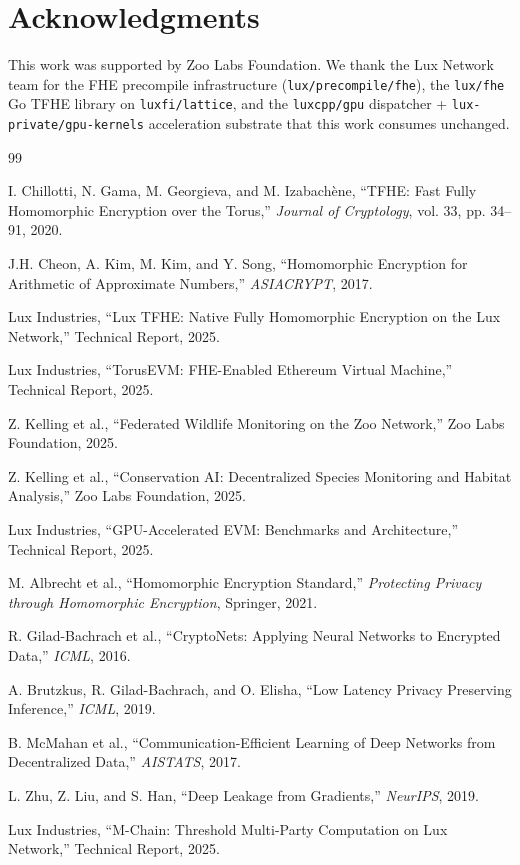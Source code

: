 \section*{Acknowledgments}


This work was supported by Zoo Labs Foundation. We thank the Lux Network team for the FHE precompile infrastructure (\texttt{lux/precompile/fhe}), the \texttt{lux/fhe} Go TFHE library on \texttt{luxfi/lattice}, and the \texttt{luxcpp/gpu} dispatcher + \texttt{lux-private/gpu-kernels} acceleration substrate that this work consumes unchanged.


\begin{thebibliography}{99}

I. Chillotti, N. Gama, M. Georgieva, and M. Izabach\`{e}ne, ``TFHE: Fast Fully Homomorphic Encryption over the Torus,'' \textit{Journal of Cryptology}, vol. 33, pp. 34--91, 2020.

J.H. Cheon, A. Kim, M. Kim, and Y. Song, ``Homomorphic Encryption for Arithmetic of Approximate Numbers,'' \textit{ASIACRYPT}, 2017.

Lux Industries, ``Lux TFHE: Native Fully Homomorphic Encryption on the Lux Network,'' Technical Report, 2025.

Lux Industries, ``TorusEVM: FHE-Enabled Ethereum Virtual Machine,'' Technical Report, 2025.

Z. Kelling et al., ``Federated Wildlife Monitoring on the Zoo Network,'' Zoo Labs Foundation, 2025.

Z. Kelling et al., ``Conservation AI: Decentralized Species Monitoring and Habitat Analysis,'' Zoo Labs Foundation, 2025.

Lux Industries, ``GPU-Accelerated EVM: Benchmarks and Architecture,'' Technical Report, 2025.

M. Albrecht et al., ``Homomorphic Encryption Standard,'' \textit{Protecting Privacy through Homomorphic Encryption}, Springer, 2021.

R. Gilad-Bachrach et al., ``CryptoNets: Applying Neural Networks to Encrypted Data,'' \textit{ICML}, 2016.

A. Brutzkus, R. Gilad-Bachrach, and O. Elisha, ``Low Latency Privacy Preserving Inference,'' \textit{ICML}, 2019.

B. McMahan et al., ``Communication-Efficient Learning of Deep Networks from Decentralized Data,'' \textit{AISTATS}, 2017.

L. Zhu, Z. Liu, and S. Han, ``Deep Leakage from Gradients,'' \textit{NeurIPS}, 2019.

Lux Industries, ``M-Chain: Threshold Multi-Party Computation on Lux Network,'' Technical Report, 2025.

\end{thebibliography}

